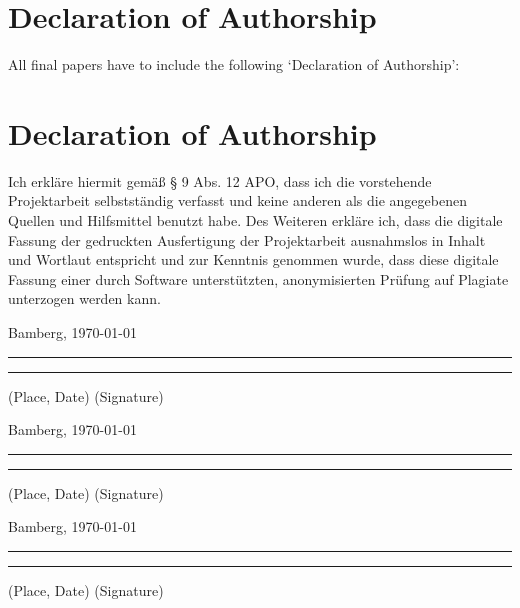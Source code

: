 \documentclass[a4paper]{article}
\begin{document}
\section*{Declaration of Authorship}
All final papers have to include the following ‘Declaration of Authorship’:

{\parindent 0cm
\section*{Declaration of Authorship}
Ich erkläre hiermit gemäß § 9 Abs. 12 APO, dass ich die vorstehende Projektarbeit selbstständig verfasst und keine anderen als die angegebenen Quellen und Hilfsmittel benutzt habe. Des Weiteren erkläre ich, dass die digitale Fassung der gedruckten Ausfertigung der Projektarbeit ausnahmslos in Inhalt und Wortlaut entspricht und zur Kenntnis genommen wurde, dass diese digitale Fassung einer durch Software unterstützten, anonymisierten Prüfung auf Plagiate unterzogen werden kann.\\
\vspace{2\baselineskip}
  
Bamberg, \today

\rule[0.5em]{14em}{0.5pt} \hspace{0.25\linewidth}\rule[0.5em]{14em}{0.5pt}
\vspace{1em}
\hspace{4em} (Place, Date) \hspace{0.51\linewidth} (Signature)

Bamberg, \today

\rule[0.5em]{14em}{0.5pt} \hspace{0.25\linewidth}\rule[0.5em]{14em}{0.5pt}
\vspace{1em}
\hspace{4em} (Place, Date) \hspace{0.51\linewidth} (Signature)

Bamberg, \today

\rule[0.5em]{14em}{0.5pt} \hspace{0.25\linewidth}\rule[0.5em]{14em}{0.5pt}
\vspace{1em}
\hspace{4em} (Place, Date) \hspace{0.51\linewidth} (Signature)
}





\end{document}
